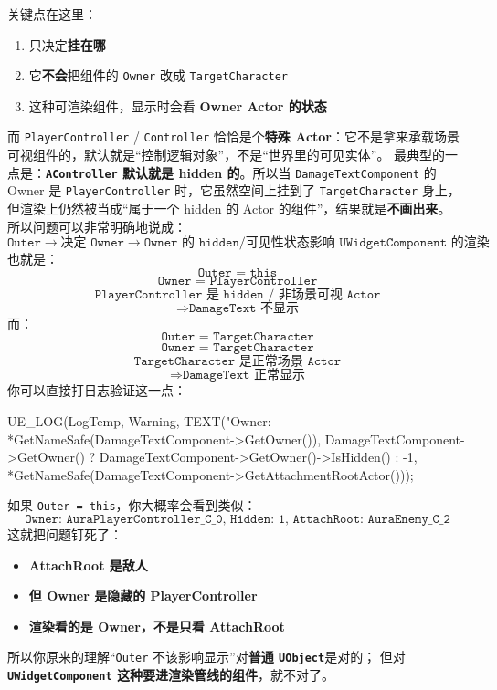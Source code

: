 \documentclass[10pt,CJKmath]{ctexart}
\begin{document}
关键点在这里：
\begin{enumerate}
	 \item {} 只决定\textbf{挂在哪} 
	 \item 它\textbf{不会}把组件的 \texttt{Owner} 改成 \texttt{TargetCharacter}
	 \item {} 这种可渲染组件，显示时会看 \textbf{Owner Actor 的状态} 
\end{enumerate}
而 \texttt{PlayerController} / \texttt{Controller} 恰恰是个\textbf{特殊 Actor}：它不是拿来承载场景可视组件的，默认就是“控制逻辑对象”，不是“世界里的可见实体”。
最典型的一点是：\textbf{\texttt{AController} 默认就是 hidden 的}。所以当 \texttt{DamageTextComponent} 的 Owner 是 \texttt{PlayerController} 时，它虽然空间上挂到了 \texttt{TargetCharacter} 身上，但渲染上仍然被当成“属于一个 hidden 的 Actor 的组件”，结果就是\textbf{不画出来}。
所以问题可以非常明确地说成：
\[ \boxed{\texttt{Outer} \rightarrow \texttt{决定 Owner} \rightarrow \texttt{Owner 的 hidden/可见性状态影响 } \texttt{UWidgetComponent 的渲染}} \]
也就是：
\[ \texttt{Outer = this} \]
\[ \texttt{Owner = PlayerController} \]
\[ \texttt{PlayerController 是 hidden / 非场景可视 Actor} \]
\[ \Rightarrow \texttt{DamageText 不显示} \]
而：
\[ \texttt{Outer = TargetCharacter} \]
\[ \texttt{Owner = TargetCharacter} \]
\[ \texttt{TargetCharacter 是正常场景 Actor} \]
\[ \Rightarrow \texttt{DamageText 正常显示} \]
你可以直接打日志验证这一点：
\begin{code}
UE_LOG(LogTemp, Warning, TEXT("Owner: %
*GetNameSafe(DamageTextComponent->GetOwner()),
DamageTextComponent->GetOwner() ? DamageTextComponent->GetOwner()->IsHidden() : -1,
*GetNameSafe(DamageTextComponent->GetAttachmentRootActor()));
\end{code}
如果 \texttt{Outer = this}，你大概率会看到类似：
\[ \texttt{Owner: AuraPlayerController\_C\_0, Hidden: 1, AttachRoot: AuraEnemy\_C\_2} \]
这就把问题钉死了：
\begin{itemize} 
	\item \textbf{AttachRoot 是敌人} 
	\item \textbf{但 Owner 是隐藏的 PlayerController} 
	\item \textbf{渲染看的是 Owner，不是只看 AttachRoot} 
\end{itemize}
所以你原来的理解“\texttt{Outer} 不该影响显示”对\textbf{普通 \texttt{UObject}}是对的；
但对 \textbf{\texttt{UWidgetComponent} 这种要进渲染管线的组件}，就不对了。
\end{document}
